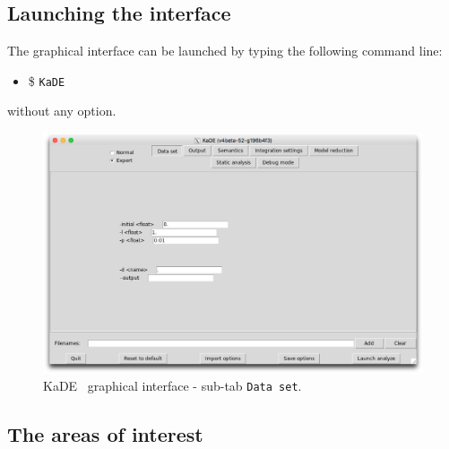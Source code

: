 \documentclass[11pt]{book}
\def\KaDE{\textsf{KaDE}}
\def\ttt#1{\texttt{#1}}
\def\ITE#1{\begin{itemize}#1\end{itemize}}
\begin{document}
\subsection{Launching the interface}

The graphical interface can be launched by typing the following command line:
\ITE{\item[\$] \ttt{KaDE}}

without any option.

\begin{figure}[htbp]
\centering
\includegraphics[width=12cm,bb=0 0 1904 1208]{img/kade_0.png}
\caption{\KaDE~ graphical interface - sub-tab \texttt{Data set}.}
\label{fig:kade:0}
\end{figure}

\subsection{The areas of interest}
\end{document}
